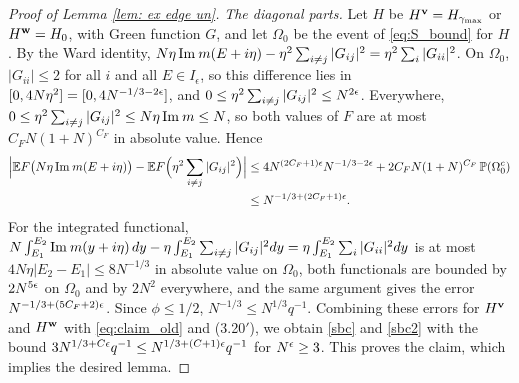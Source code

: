 \begin{proof}[Proof of Lemma \ref{lem: ex edge un}]
\textit{The diagonal parts.} Let $H$ be $H^{\mathbf{v}}=H_{\gamma_{\max}}$ or $H^{\mathbf{w}}=H_0$, with Green function $G$, and let $\Omega_0$ be the event of \eqref{eq:S_bound} for $H$. By the Ward identity, $N\eta\,\mathrm{Im}\: m(E+i\eta)-\eta^2\sum_{i\ne j}|G_{ij}|^2=\eta^2\sum_i|G_{ii}|^2$. On $\Omega_0$, $|G_{ii}|\le2$ for all $i$ and all $E\in I_\epsilon$, so this difference lies in $[0,4N\eta^2]=[0,4N^{-1/3-2\epsilon}]$, and $0\le\eta^2\sum_{i\ne j}|G_{ij}|^2\le N^{2\epsilon}$. Everywhere, $0\le\eta^2\sum_{i\ne j}|G_{ij}|^2\le N\eta\,\mathrm{Im}\: m\le N$, so both values of $F$ are at most $C_FN(1+N)^{C_F}$ in absolute value. Hence
\begin{align*}
\Big|\mathbb{E} F\big(N\eta\,\mathrm{Im}\: m(E+i\eta)\big)-\mathbb{E} F\Big(\eta^2\sum_{i\ne j}|G_{ij}|^2\Big)\Big|&\le 4N^{(2C_F+1)\epsilon}N^{-1/3-2\epsilon}+2C_FN(1+N)^{C_F}\,\mathbb{P}(\Omega_0^c)\\
&\le N^{-1/3+(2C_F+1)\epsilon}.
\end{align*}
For the integrated functional, $N\int_{E_1}^{E_2}\mathrm{Im}\: m(y+i\eta)\,dy-\eta\int_{E_1}^{E_2}\sum_{i\ne j}|G_{ij}|^2dy=\eta\int_{E_1}^{E_2}\sum_i|G_{ii}|^2dy$ is at most $4N\eta|E_2-E_1|\le 8N^{-1/3}$ in absolute value on $\Omega_0$, both functionals are bounded by $2N^{5\epsilon}$ on $\Omega_0$ and by $2N^2$ everywhere, and the same argument gives the error $N^{-1/3+(5C_F+2)\epsilon}$. Since $\phi\le1/2$, $N^{-1/3}\le N^{1/3}q^{-1}$. Combining these errors for $H^{\mathbf{v}}$ and $H^{\mathbf{w}}$ with \eqref{eq:claim_old} and (3.20$'$), we obtain \eqref{sbc} and \eqref{sbc2} with the bound $3N^{1/3+C\epsilon}q^{-1}\le N^{1/3+(C+1)\epsilon}q^{-1}$ for $N^{\epsilon}\ge3$. This proves the claim, which implies the desired lemma.
\end{proof}

